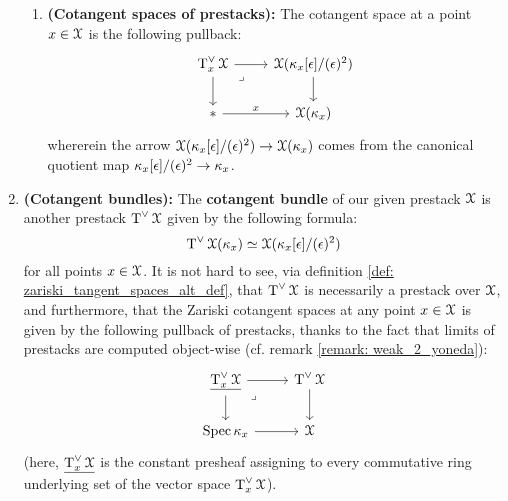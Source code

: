 \begin{definition}
\begin{enumerate}
\begin{enumerate}
                                \item \textbf{(Cotangent spaces of prestacks):} The cotangent space at a point $x \in \mathcal{X}$ is the following pullback:
                                    $$
                                        \begin{tikzcd}
                                        	{\tangent^{\vee}_x\calX} & {\calX(\kappa_x[\e]/(\e)^2)} \\
                                        	{*} & {\calX(\kappa_x)}
                                        	\arrow["x", from=2-1, to=2-2]
                                        	\arrow[from=1-1, to=2-1]
                                        	\arrow[from=1-1, to=1-2]
                                        	\arrow[from=1-2, to=2-2]
                                        	\arrow["\lrcorner"{anchor=center, pos=0.125}, draw=none, from=1-1, to=2-2]
                                        \end{tikzcd}
                                    $$
                                whererein the arrow $\mathcal{X}(\kappa_x[\epsilon]/(\epsilon)^2) \to \mathcal{X}(\kappa_x)$ comes from the canonical quotient map $\kappa_x[\epsilon]/(\epsilon)^2 \to \kappa_x$.
                            \end{enumerate}
                        \item \textbf{(Cotangent bundles):} The \textbf{cotangent bundle} of our given prestack $\mathcal{X}$ is another prestack $\operatorname{T}^{\vee}\mathcal{X}$ given by the following formula:
                            $$\operatorname{T}^{\vee}\mathcal{X}(\kappa_x) \simeq \mathcal{X}(\kappa_x[\epsilon]/(\epsilon)^2)$$
                        for all points $x \in \mathcal{X}$. It is not hard to see, via definition \ref{def: zariski_tangent_spaces_alt_def}, that $\operatorname{T}^{\vee}\mathcal{X}$ is necessarily a prestack over $\mathcal{X}$, and furthermore, that the Zariski cotangent spaces at any point $x \in \mathcal{X}$ is given by the following pullback of prestacks, thanks to the fact that limits of prestacks are computed object-wise (cf. remark \ref{remark: weak_2_yoneda}):
                            $$
                                \begin{tikzcd}
                                	{\underline{\tangent^{\vee}_x\calX}} & {\tangent^{\vee}\calX} \\
                                	{\Spec \kappa_x} & \calX
                                	\arrow[from=1-2, to=2-2]
                                	\arrow[from=2-1, to=2-2]
                                	\arrow[from=1-1, to=1-2]
                                	\arrow[from=1-1, to=2-1]
                                	\arrow["\lrcorner"{anchor=center, pos=0.125}, draw=none, from=1-1, to=2-2]
                                \end{tikzcd}
                            $$
                        (here, $\underline{\operatorname{T}^{\vee}_x\mathcal{X}}$ is the constant presheaf assigning to every commutative ring underlying set of the vector space $\operatorname{T}^{\vee}_x\mathcal{X}$).
                    \end{enumerate}
            \end{definition}
